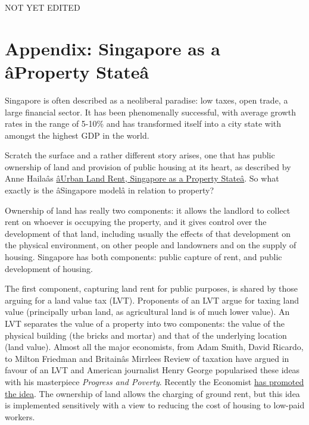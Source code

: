 \documentclass[]{tufte-handout}
\begin{document}
NOT YET EDITED

\hypertarget{appendix-singapore-as-a-aproperty-statea}{%
\section{\texorpdfstring{\textbf{Appendix: Singapore as a âProperty
Stateâ}}{Appendix: Singapore as a âProperty Stateâ}}\label{appendix-singapore-as-a-aproperty-statea}}

Singapore is often described as a neoliberal paradise: low taxes, open
trade, a large financial sector. It has been phenomenally successful,
with average growth rates in the range of 5-10\% and has transformed
itself into a city state with amongst the highest GDP in the world.

Scratch the surface and a rather different story arises, one that has
public ownership of land and provision of public housing at its heart,
as described by Anne Hailaâs
\href{https://onlinelibrary.wiley.com/doi/book/10.1002/9781118827611}{âUrban
Land Rent, Singapore as a Property Stateâ}. So what exactly is the
âSingapore modelâ in relation to property?

Ownership of land has really two components: it allows the landlord to
collect rent on whoever is occupying the property, and it gives control
over the development of that land, including usually the effects of that
development on the physical environment, on other people and landowners
and on the supply of housing. Singapore has both components: public
capture of rent, and public development of housing.

The first component, capturing land rent for public purposes, is shared
by those arguing for a land value tax (LVT). Proponents of an LVT argue
for taxing land value (principally urban land, as agricultural land is
of much lower value). An LVT separates the value of a property into two
components: the value of the physical building (the bricks and mortar)
and that of the underlying location (land value). Almost all the major
economists, from Adam Smith, David Ricardo, to Milton Friedman and
Britainâs Mirrlees Review of taxation have argued in favour of an LVT
and American journalist Henry George popularised these ideas with his
masterpiece \emph{Progress and Poverty}. Recently the Economist
\href{https://www.economist.com/briefing/2018/08/09/the-time-may-be-right-for-land-value-taxes}{has
promoted the idea}. The ownership of land allows the charging of ground
rent, but this idea is implemented sensitively with a view to reducing
the cost of housing to low-paid workers.
\end{document}
